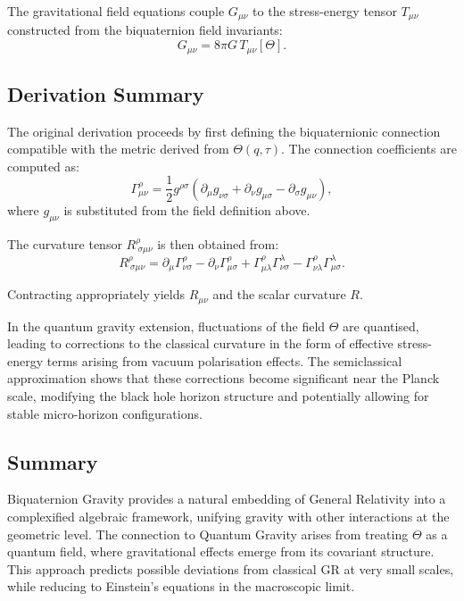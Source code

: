 The gravitational field equations couple $G_{\mu\nu}$ to the stress-energy tensor
$T_{\mu\nu}$ constructed from the biquaternion field invariants:
\begin{equation}
  G_{\mu\nu} = 8\pi G \, T_{\mu\nu}[\Theta] .
\end{equation}

\subsection{Derivation Summary}

The original derivation proceeds by first defining the biquaternionic connection
compatible with the metric derived from $\Theta(q,\tau)$. The connection coefficients
are computed as:
\begin{equation}
  \Gamma^\rho_{\mu\nu} =
  \frac{1}{2} g^{\rho\sigma} \left( \partial_\mu g_{\nu\sigma}
  + \partial_\nu g_{\mu\sigma}
  - \partial_\sigma g_{\mu\nu} \right),
\end{equation}
where $g_{\mu\nu}$ is substituted from the field definition above.

The curvature tensor $R^\rho_{\ \sigma\mu\nu}$ is then obtained from:
\begin{equation}
  R^\rho_{\ \sigma\mu\nu} =
  \partial_\mu \Gamma^\rho_{\nu\sigma} -
  \partial_\nu \Gamma^\rho_{\mu\sigma} +
  \Gamma^\rho_{\mu\lambda} \Gamma^\lambda_{\nu\sigma} -
  \Gamma^\rho_{\nu\lambda} \Gamma^\lambda_{\mu\sigma} .
\end{equation}

Contracting appropriately yields $R_{\mu\nu}$ and the scalar curvature $R$.

In the quantum gravity extension, fluctuations of the field $\Theta$ are quantised,
leading to corrections to the classical curvature in the form of effective stress-energy
terms arising from vacuum polarisation effects. The semiclassical approximation shows that
these corrections become significant near the Planck scale, modifying the black hole
horizon structure and potentially allowing for stable micro-horizon configurations.

\subsection{Summary}

Biquaternion Gravity provides a natural embedding of General Relativity into a
complexified algebraic framework, unifying gravity with other interactions at the
geometric level. The connection to Quantum Gravity arises from treating $\Theta$ as a
quantum field, where gravitational effects emerge from its covariant structure. This
approach predicts possible deviations from classical GR at very small scales, while
reducing to Einstein's equations in the macroscopic limit.